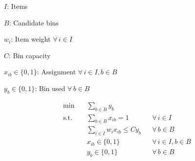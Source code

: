 
\noindent $I$: Items\par
\noindent $B$: Candidate bins\par
\noindent $w_i$: Item weight $\forall\,i\in I$\par
\noindent $C$: Bin capacity\par
\noindent $x_{ib}\in\{0,1\}$: Assignment $\forall\,i\in I,b\in B$\par
\noindent $y_b\in\{0,1\}$: Bin used $\forall\,b\in B$\par
\begin{align}
  \min\quad &\sum_{b\in B}y_b && \label{bin-packing:0} \\
  \text{s.t.}\quad &\sum_{b\in B}x_{ib}=1 &&\forall\,i\in I \label{bin-packing:1} \\
  &\sum_{i\in I}w_i x_{ib}\leq C y_b &&\forall\,b\in B \label{bin-packing:2} \\
  &x_{ib}\in\{0,1\} &&\forall\,i\in I,b\in B \label{bin-packing:3} \\
  &y_b\in\{0,1\} &&\forall\,b\in B \label{bin-packing:4}
\end{align}

